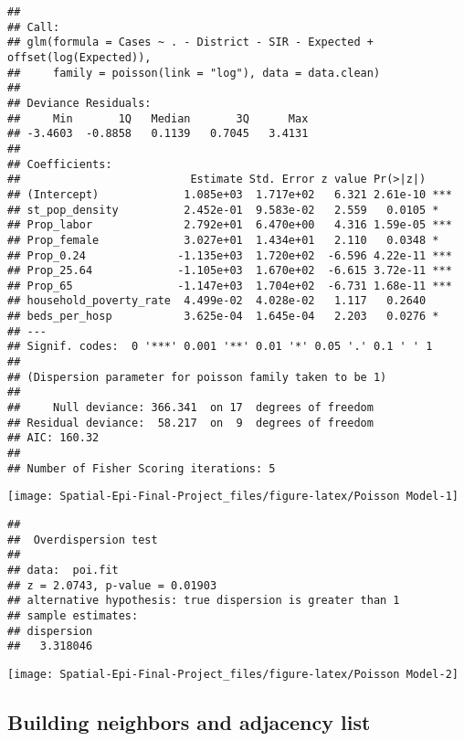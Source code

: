 \documentclass[]{article}
\begin{document}
\begin{verbatim}
## 
## Call:
## glm(formula = Cases ~ . - District - SIR - Expected + offset(log(Expected)), 
##     family = poisson(link = "log"), data = data.clean)
## 
## Deviance Residuals: 
##     Min       1Q   Median       3Q      Max  
## -3.4603  -0.8858   0.1139   0.7045   3.4131  
## 
## Coefficients:
##                          Estimate Std. Error z value Pr(>|z|)    
## (Intercept)             1.085e+03  1.717e+02   6.321 2.61e-10 ***
## st_pop_density          2.452e-01  9.583e-02   2.559   0.0105 *  
## Prop_labor              2.792e+01  6.470e+00   4.316 1.59e-05 ***
## Prop_female             3.027e+01  1.434e+01   2.110   0.0348 *  
## Prop_0.24              -1.135e+03  1.720e+02  -6.596 4.22e-11 ***
## Prop_25.64             -1.105e+03  1.670e+02  -6.615 3.72e-11 ***
## Prop_65                -1.147e+03  1.704e+02  -6.731 1.68e-11 ***
## household_poverty_rate  4.499e-02  4.028e-02   1.117   0.2640    
## beds_per_hosp           3.625e-04  1.645e-04   2.203   0.0276 *  
## ---
## Signif. codes:  0 '***' 0.001 '**' 0.01 '*' 0.05 '.' 0.1 ' ' 1
## 
## (Dispersion parameter for poisson family taken to be 1)
## 
##     Null deviance: 366.341  on 17  degrees of freedom
## Residual deviance:  58.217  on  9  degrees of freedom
## AIC: 160.32
## 
## Number of Fisher Scoring iterations: 5
\end{verbatim}

\begin{center}\texttt{[image: Spatial-Epi-Final-Project\_files/figure-latex/Poisson Model-1]} \end{center}

\begin{verbatim}
## 
##  Overdispersion test
## 
## data:  poi.fit
## z = 2.0743, p-value = 0.01903
## alternative hypothesis: true dispersion is greater than 1
## sample estimates:
## dispersion 
##   3.318046
\end{verbatim}

\begin{center}\texttt{[image: Spatial-Epi-Final-Project\_files/figure-latex/Poisson Model-2]} \end{center}

\hypertarget{building-neighbors-and-adjacency-list}{%
\subsection{Building neighbors and adjacency
list}\label{building-neighbors-and-adjacency-list}}
\end{document}
